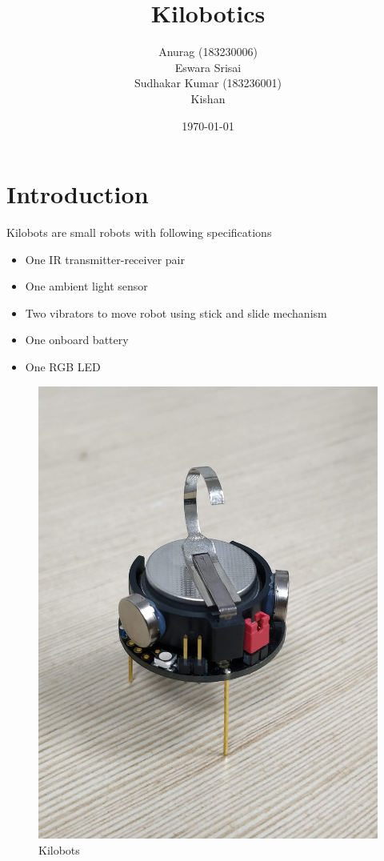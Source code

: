 \documentclass{article}
\title{Kilobotics}
\author{Anurag (183230006)\\ Eswara Srisai \\ Sudhakar Kumar (183236001) \\ Kishan}
\date{\today}
\begin{document}
\maketitle

\section{Introduction}
Kilobots are small robots with following specifications
\begin{itemize}
	\item One IR transmitter-receiver pair
	\item One ambient light sensor
	\item Two vibrators to move robot using stick and slide mechanism
	\item One onboard battery
	\item One RGB LED
\end{itemize}
\begin{figure}[H]
	\centering
	\includegraphics[scale=0.04]{images/kilobots}
	\caption{Kilobots}
\end{figure}
\end{document}
